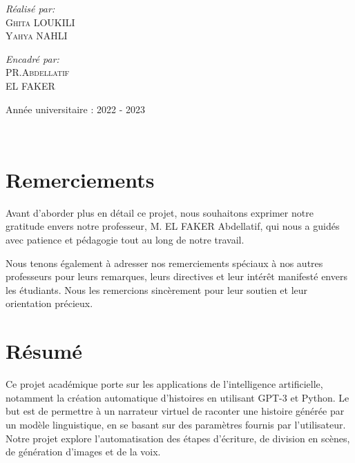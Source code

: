 \documentclass[11,5pt]{report}
\begin{document}
\begin{spacing}{2}
\begin{titlepage}
\begin{center}
\vspace{1cm}
\begin{minipage}{0.4\textwidth}
\begin{flushleft} \large
\emph{Réalisé par:}\\
\textsc{Ghita LOUKILI }\\
\textsc{Yahya NAHLI }\\
\end{flushleft}
\end{minipage}
\begin{minipage}{0.4\textwidth}
\begin{flushright} \large
\emph{Encadré par:} \\
\textsc{PR.Abdellatif \\EL FAKER}\\
\end{flushright}
\end{minipage}

\vfill

{\large Année universitaire : 2022 - 2023}

\end{center}
\end{titlepage}

\newpage
\thispagestyle{empty}
~
\chapter*{Remerciements}
\large
\begin{onehalfspace}
Avant d'aborder plus en détail ce projet, nous souhaitons exprimer notre gratitude envers notre professeur, M. EL FAKER Abdellatif, qui nous a guidés avec patience et pédagogie tout au long de notre travail.

Nous tenons également à adresser nos remerciements spéciaux à nos autres professeurs pour leurs remarques, leurs directives et leur intérêt manifesté envers les étudiants. Nous les remercions sincèrement pour leur soutien et leur orientation précieux.
\end{onehalfspace}
\thispagestyle{empty}
\newpage

\chapter*{Résumé}
\large
\begin{onehalfspace}
Ce projet académique porte sur les applications de l’intelligence artificielle, notamment la création automatique d’histoires en utilisant GPT-3 et Python. Le but est de permettre à un narrateur virtuel de raconter une histoire générée par un modèle linguistique, en se basant sur des paramètres fournis par l’utilisateur. Notre projet explore l’automatisation des étapes d’écriture, de division en scènes, de génération d’images et de la voix.


\end{onehalfspace}
\end{spacing}
\end{document}
